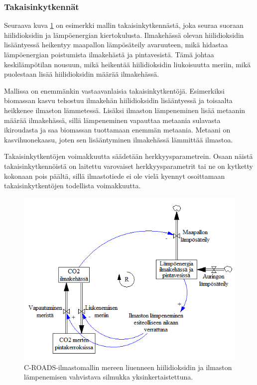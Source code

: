 \documentclass[finnish,12pt,a4paper,pdftex]{article}
\begin{document}
\begin{onehalfspacing}
\subsubsection*{Takaisinkytkennät \label{ilmasto:croads:takaisinkytkennät}}

Seuraava kuva \ref{ilmasto:co2-lampo} on esimerkki mallin takaisinkytkennästä, joka seuraa suoraan hiilidioksidin ja lämpöenergian kiertokulusta. Ilmakehässä olevan hiilidioksidin lisääntyessä heikentyy maapallon lämpösäteily avaruuteen, mikä hidastaa lämpöenergian poistumista ilmakehästä ja pintavesistä. Tämä johtaa keskilämpötilan nousuun, mikä heikentää hiilidioksidin liukoisuutta meriin, mikä puolestaan lisää hiilidioksidin määrää ilmakehässä. \cite{Croads, CroadsFlightSimulator2011}

Mallissa on enemmänkin vastaavanlaisia takaisinkytkentöjä. Esimerkiksi biomassan kasvu tehostuu ilmakehän hiilidioksidin lisääntyessä ja toisaalta heikkenee ilmaston lämmetessä. Lisäksi ilmaston lämpeneminen lisää metaanin määrää ilmakehässä, sillä lämpeneminen vapauttaa metaania sulavasta ikiroudasta ja saa biomassan tuottamaan enemmän metaania. Metaani on kasvihuonekaasu, joten sen lisääntyminen ilmakehässä lämmittää ilmastoa. \cite{CroadsFlightSimulator2011}

Takaisinkytkentöjen voimakkuutta säädetään herkkyysparametrein. Osaan näistä takaisinkytkennöistä on laitettu varovaiset herkkyysparametrit tai ne on kytketty kokonaan pois päältä, sillä ilmastotiede ei ole vielä kyennyt osoittamaan takaisinkytkentöjen todellista voimakkuutta. \cite{CroadsFlightSimulator2011}

\begin{figure}[H]
\centering \includegraphics[width=\textwidth]{c-roads-co2-lampo}
\caption{C-ROADS-ilmastomallin mereen liuenneen hiilidioksidin ja ilmaston lämpenemisen vahvistava silmukka yksinkertaistettuna. \cite{Croads} \label{ilmasto:co2-lampo}}
\end{figure}


\end{onehalfspacing}
\end{document}
